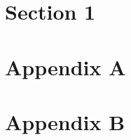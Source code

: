 \documentclass{article}
\begin{document}
\section{Section 1}
\pdchapterappendix
\section{Appendix A}
\section{Appendix B}
\end{document}
